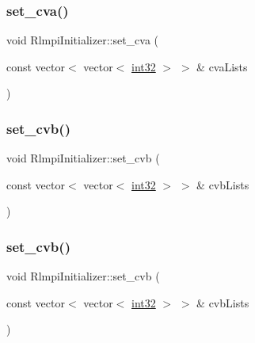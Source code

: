 \mbox{\label{classRlmpiInitializer_a8473df40ea79d01a8c6fcc1b7c8821ba}} 
\subsubsection{\texorpdfstring{set\_cva()}{set\_cva()}\hspace{0.1cm}{\footnotesize\ttfamily [2/2]}}
{\footnotesize\ttfamily void Rlmpi\+Initializer\+::set\+\_\+cva (\begin{DoxyParamCaption}\item[{const vector$<$ vector$<$ \mbox{\hyperlink{include_2RlmpiShared_8h_a56f1a81c92849566ae864511088eb7e8}{int32}} $>$ $>$ \&}]{cva\+Lists }\end{DoxyParamCaption})}

\mbox{\label{classRlmpiInitializer_a5b19bad74e8bdd02208de813906e86ca}} 
\subsubsection{\texorpdfstring{set\_cvb()}{set\_cvb()}\hspace{0.1cm}{\footnotesize\ttfamily [1/2]}}
{\footnotesize\ttfamily void Rlmpi\+Initializer\+::set\+\_\+cvb (\begin{DoxyParamCaption}\item[{const vector$<$ vector$<$ \mbox{\hyperlink{include_2RlmpiShared_8h_a56f1a81c92849566ae864511088eb7e8}{int32}} $>$ $>$ \&}]{cvb\+Lists }\end{DoxyParamCaption})}

\mbox{\label{classRlmpiInitializer_a5b19bad74e8bdd02208de813906e86ca}} 
\subsubsection{\texorpdfstring{set\_cvb()}{set\_cvb()}\hspace{0.1cm}{\footnotesize\ttfamily [2/2]}}
{\footnotesize\ttfamily void Rlmpi\+Initializer\+::set\+\_\+cvb (\begin{DoxyParamCaption}\item[{const vector$<$ vector$<$ \mbox{\hyperlink{include_2RlmpiShared_8h_a56f1a81c92849566ae864511088eb7e8}{int32}} $>$ $>$ \&}]{cvb\+Lists }\end{DoxyParamCaption})}

